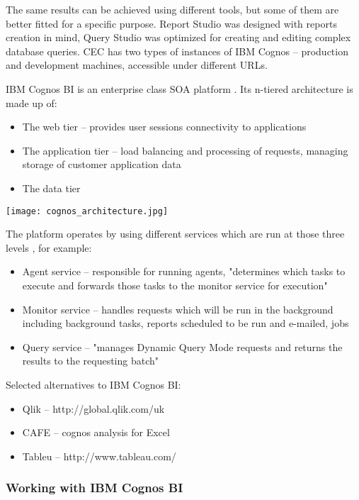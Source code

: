 The same results can be achieved using different tools, but some of them are better fitted for a specific purpose. Report Studio was designed with reports creation in mind, Query Studio was optimized for creating and editing complex database queries. CEC has two types of instances of IBM Cognos – production and development machines, accessible under different URLs.

IBM Cognos BI is an enterprise class SOA platform \citep{browne2010ibm}. Its n-tiered architecture is made up of:
\begin{itemize}
\item The web tier – provides user sessions connectivity to applications
\item The application tier – load balancing and processing of requests, managing storage of customer application data
\item The data tier
\end{itemize}


\begin{center}
  \texttt{[image: cognos\_architecture.jpg]}
  \label{normal_case}
\end{center}


The platform operates by using different services which are run at those three levels \citep{Browne2010}, for example:
\begin{itemize}
\item Agent service – responsible for running agents, "determines which tasks to execute and forwards those tasks to the monitor service for execution"
\item Monitor service – handles requests which will be run in the background including background tasks, reports scheduled to be run and e-mailed, jobs
\item Query service – "manages Dynamic Query Mode requests and returns the results to the requesting batch"
\end{itemize}
			
Selected alternatives to IBM Cognos BI:
\begin{itemize}
\item Qlik – http://global.qlik.com/uk
\item CAFE – cognos analysis for Excel
\item Tableu – http://www.tableau.com/
\end{itemize}			
			
			\subsubsection{Working with IBM Cognos BI}
			
